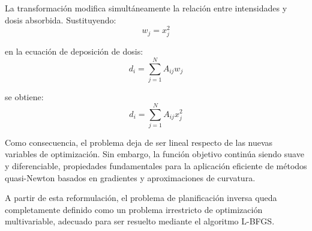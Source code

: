 La transformación modifica simultáneamente la relación entre intensidades y dosis absorbida. Sustituyendo:
\[
w_j=x_j^2
\]

en la ecuación de deposición de dosis:
\[
d_i=
\sum_{j=1}^{N}
A_{ij}w_j
\]

se obtiene:
\[
d_i=
\sum_{j=1}^{N}
A_{ij}x_j^2
\]

Como consecuencia, el problema deja de ser lineal respecto de las nuevas variables de optimización. Sin embargo, la función objetivo continúa siendo suave y diferenciable, propiedades fundamentales para la aplicación eficiente de métodos quasi-Newton basados en gradientes y aproximaciones de curvatura.

A partir de esta reformulación, el problema de planificación inversa queda completamente definido como un problema irrestricto de optimización multivariable, adecuado para ser resuelto mediante el algoritmo L-BFGS.